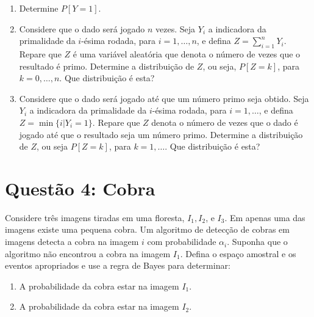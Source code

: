 \documentclass[12 pt]{article}
\begin{document}
\begin{enumerate}
    \item Determine $P [Y = 1]$.
    \begin{tcolorbox}[colframe=black, title=Resposta:]

    \end{tcolorbox}
    \item Considere que o dado será jogado $n$ vezes. Seja $Y_i$ a indicadora da primalidade da $i$-ésima rodada,
          para $i = 1, \dots, n$, e defina $Z = \sum_{i=1}^{n} Y_i$. Repare que $Z$ é uma variável aleatória que denota o
          número de vezes que o resultado é primo. Determine a distribuição de $Z$, ou seja, $P [Z = k]$, para
          $k = 0, \dots, n$. Que distribuição é esta?
          \begin{tcolorbox}[colframe=black, title=Resposta:]

          \end{tcolorbox}
    \item Considere que o dado será jogado até que um número primo seja obtido. Seja $Y_i$ a indicadora da
          primalidade da $i$-ésima rodada, para $i = 1, \dots$, e defina $Z = \min\{i | Y_i = 1\}$. Repare que $Z$ denota o
          número de vezes que o dado é jogado até que o resultado seja um número primo. Determine a
          distribuição de $Z$, ou seja $P [Z = k]$, para $k = 1, \dots$. Que distribuição é esta?
          \begin{tcolorbox}[colframe=black, title=Resposta:]

          \end{tcolorbox}
\end{enumerate}

\section*{Questão 4: Cobra}
Considere três imagens tiradas em uma floresta, $I_1, I_2$, e $I_3$. Em apenas uma das imagens existe uma
pequena cobra. Um algoritmo de detecção de cobras em imagens detecta a cobra na imagem $i$ com
probabilidade $\alpha_i$. Suponha que o algoritmo não encontrou a cobra na imagem $I_1$. Defina o espaço
amostral e os eventos apropriados e use a regra de Bayes para determinar:

\begin{enumerate}
    \item A probabilidade da cobra estar na imagem $I_1$.
    \begin{tcolorbox}[colframe=black, title=Resposta:]

    \end{tcolorbox}
    \item A probabilidade da cobra estar na imagem $I_2$.
    \begin{tcolorbox}[colframe=black, title=Resposta:]

    \end{tcolorbox}
\end{enumerate}
\end{document}
